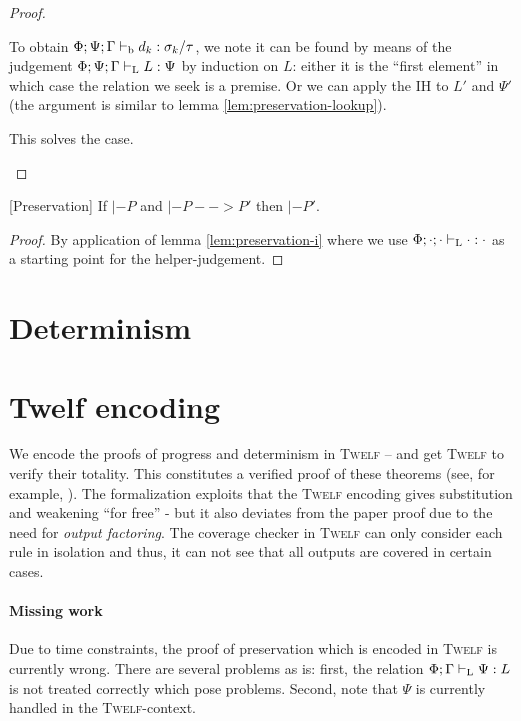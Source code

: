 \documentclass[a4paper, oneside, 10pt, draft]{memoir}
\newcommand{\twelf}{\textsc{Twelf}}
\begin{document}
\begin{proof}
\begin{itemize}
    To obtain $\Phi;\Psi;\Gamma |-_{\mathrm{b}} d_k : \sigma_k / \tau$, we note
    it can be found by means of the judgement $\Phi;\Psi;\Gamma |-_{\mathrm{L}}
    L : \Psi$ by induction on $L$: either it is the ``first
    element'' in which case the relation we seek is a premise. Or we
    can apply the IH to $L'$ and $\Psi'$ (the argument is similar to
    lemma \ref{lem:preservation-lookup}).

    This solves the case.
  \end{itemize}
\end{proof}

\begin{thm}{[Preservation]}
  \label{thm:preservation}
  If $|- P$ and $|- P --> P'$ then $|- P'$.
\end{thm}
\begin{proof}
  By application of lemma \ref{lem:preservation-i} where we use
  $\Phi;\cdot;\cdot |-_{\mathrm{L}} \cdot : \cdot$ as a starting point for the
  helper-judgement.
\end{proof}
\section{Determinism}

\section{Twelf encoding}

We encode the proofs of progress and determinism in \twelf{} -- and
get \twelf{} to verify their totality. This constitutes a verified
proof of these theorems (see, for example,
\cite{harper.crary:2005:how}). The formalization exploits that the
\twelf{} encoding gives substitution and weakening ``for free'' - but
it also deviates from the paper proof due to the need for \emph{output
  factoring}. The coverage checker in \twelf{} can only consider each
rule in isolation and thus, it can not see that all outputs are
covered in certain cases.

\paragraph{Missing work}
Due to time constraints, the proof of preservation which is encoded in
\twelf{} is currently wrong. There are several problems as is: first,
the relation $\Phi;\Gamma |-_{\mathrm{L}} \Psi : L$ is not treated correctly
which pose problems. Second, note that $\Psi$ is currently handled in
the \twelf{}-context.
\end{document}
